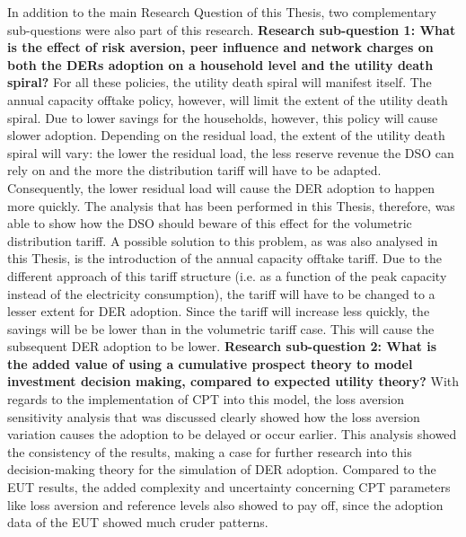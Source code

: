 \newline \newline \noindent
In addition to the main Research Question of this Thesis, two complementary sub-questions were also part of this research. 
\newline \newline \noindent
\textbf{Research sub-question 1: What is the effect of risk aversion, peer influence and network charges on both the DERs adoption on a household level and the utility death spiral?}
\newline \newline \noindent
For all these policies, the utility death spiral will manifest itself. The annual capacity offtake policy, however, will limit the extent of the utility death spiral. Due to lower savings for the households, however, this policy will cause slower adoption.  Depending on the residual load, the extent of the utility death spiral will vary: the lower the residual load, the less reserve revenue the DSO can rely on and the more the distribution tariff will have to be adapted. Consequently, the lower residual load will cause the DER adoption to happen more quickly. The analysis that has been performed in this Thesis, therefore, was able to show how the DSO should beware of this effect for the volumetric distribution tariff. A possible solution to this problem, as was also analysed in this Thesis, is the introduction of the annual capacity offtake tariff. Due to the different approach of this tariff structure (i.e. as a function of the peak capacity instead of the electricity consumption), the tariff will have to be changed to a lesser extent for DER adoption. Since the tariff will increase less quickly, the savings will be be lower than in the volumetric tariff case. This will cause the subsequent DER adoption to be lower. 
\newline \newline \noindent
\textbf{Research sub-question 2: What is the added value of using a cumulative prospect theory to model investment decision making, compared to expected utility theory?}
\newline \newline \noindent
With regards to the implementation of CPT into this model, the loss aversion sensitivity analysis that was discussed clearly showed how the loss aversion variation causes the adoption to be delayed or occur earlier. This analysis showed the consistency of the results, making a case for further research into this decision-making theory for the simulation of DER adoption. Compared to the EUT results, the added complexity and uncertainty concerning CPT parameters like loss aversion and reference levels also showed to pay off, since the adoption data of the EUT showed much cruder patterns.
